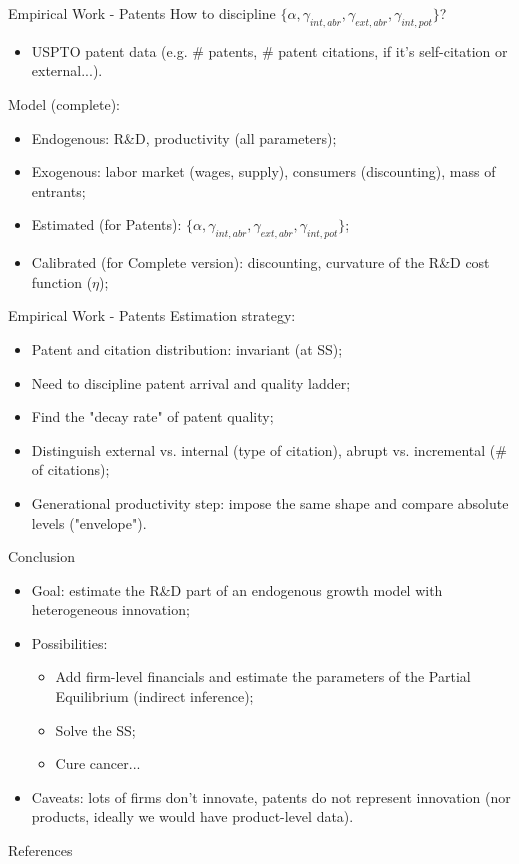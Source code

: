 \documentclass[11pt]{beamer}
\begin{document}
\begin{frame}{Empirical Work - Patents}
How to discipline $\{\alpha, \gamma_{int, abr}, \gamma_{ext,abr},\gamma_{int, pot}\}$?
	\begin{itemize}\itemsep12pt	
		\item USPTO patent data (e.g. \# patents, \# patent citations, if it's self-citation or external...).
	\end{itemize}
Model (complete):
	\begin{itemize}
		\item Endogenous: R\&D, productivity (all parameters);
		\item Exogenous: labor market (wages, supply), consumers (discounting), mass of entrants;
		\item Estimated (for Patents): $\{\alpha, \gamma_{int, abr}, \gamma_{ext,abr},\gamma_{int, pot}\}$;
		\item Calibrated (for Complete version): discounting, curvature of the R\&D cost function ($\eta$);
	\end{itemize}
\end{frame}

\begin{frame}{Empirical Work - Patents}
Estimation strategy:
	\begin{itemize}\itemsep12pt	
		\item Patent and citation distribution: invariant (at SS);
		\item Need to discipline patent arrival and quality ladder;
		\item Find the "decay rate" of patent quality;
		\item Distinguish external vs. internal (type of citation), abrupt vs. incremental (\# of citations);
		\item Generational productivity step: impose the same shape and compare absolute levels ("envelope").
	\end{itemize}
\end{frame}

\begin{frame}{Conclusion}
\begin{itemize}\itemsep12pt	
		\item Goal: estimate the R\&D part of an endogenous growth model with heterogeneous innovation;
		\item Possibilities: 
		\begin{itemize}\itemsep12pt
			\item Add firm-level financials and estimate the parameters of the Partial Equilibrium (indirect inference);
			\item Solve the SS;
			\item Cure cancer...
		\end{itemize}
		\item Caveats: lots of firms don't innovate, patents do not represent innovation (nor products, ideally we would have product-level data).
	\end{itemize}
\end{frame}

\begin{frame}{References}
	\nocite{*}
	
\end{frame}
\end{document}
